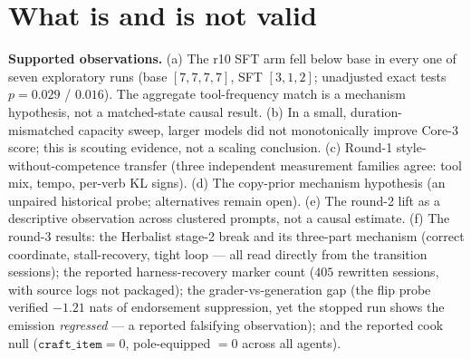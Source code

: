 \documentclass[11pt]{article}
\begin{document}
\section{What is and is not valid}

\textbf{Supported observations.} (a) The r10 SFT arm fell below base in every one of seven
exploratory runs (base $[7,7,7,7]$, SFT $[3,1,2]$; unadjusted exact tests
$p{=}0.029$ / $0.016$). The aggregate tool-frequency match is a mechanism hypothesis, not a
matched-state causal result. (b) In a small, duration-mismatched capacity sweep, larger models did
not monotonically improve Core-3 score; this is scouting evidence, not a scaling conclusion.
(c) Round-1 style-without-competence transfer (three
independent measurement families agree: tool mix, tempo, per-verb KL signs). (d) The copy-prior
mechanism hypothesis (an unpaired historical probe; alternatives remain open). (e) The round-2
lift as a descriptive observation across clustered prompts, not a causal estimate. (f) The round-3 results: the Herbalist stage-2 break and its three-part
mechanism (correct coordinate, stall-recovery, tight loop --- all read directly from the
transition sessions); the reported harness-recovery marker count ($405$ rewritten sessions,
with source logs not packaged); the grader-vs-generation gap (the flip
probe verified $-1.21$ nats of endorsement suppression, yet the stopped run shows the emission
\emph{regressed} --- a reported falsifying observation); and the reported cook null
($\texttt{craft\_item}=0$, pole-equipped $=0$ across all agents).
\end{document}

